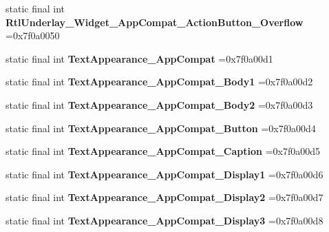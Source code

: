 \begin{DoxyCompactItemize}
static final int {\bfseries Rtl\+Underlay\+\_\+\+Widget\+\_\+\+App\+Compat\+\_\+\+Action\+Button\+\_\+\+Overflow} =0x7f0a0050
\item 
\mbox{\label{classproject4_1_1xaria_1_1R_1_1style_ad746fd97f7045ed3f1735d70d76e9b8c}} 
static final int {\bfseries Text\+Appearance\+\_\+\+App\+Compat} =0x7f0a00d1
\item 
\mbox{\label{classproject4_1_1xaria_1_1R_1_1style_af5e974f4d425de082885418842ece0b6}} 
static final int {\bfseries Text\+Appearance\+\_\+\+App\+Compat\+\_\+\+Body1} =0x7f0a00d2
\item 
\mbox{\label{classproject4_1_1xaria_1_1R_1_1style_af307531041d8a1179502a497781e851b}} 
static final int {\bfseries Text\+Appearance\+\_\+\+App\+Compat\+\_\+\+Body2} =0x7f0a00d3
\item 
\mbox{\label{classproject4_1_1xaria_1_1R_1_1style_a5e00b61bbb6da88ff24a04623fab1ce2}} 
static final int {\bfseries Text\+Appearance\+\_\+\+App\+Compat\+\_\+\+Button} =0x7f0a00d4
\item 
\mbox{\label{classproject4_1_1xaria_1_1R_1_1style_a8b34bb82b312c74e69f8eb02b7ac915a}} 
static final int {\bfseries Text\+Appearance\+\_\+\+App\+Compat\+\_\+\+Caption} =0x7f0a00d5
\item 
\mbox{\label{classproject4_1_1xaria_1_1R_1_1style_a851ed6e82ce55944280eeaa3a0200ccc}} 
static final int {\bfseries Text\+Appearance\+\_\+\+App\+Compat\+\_\+\+Display1} =0x7f0a00d6
\item 
\mbox{\label{classproject4_1_1xaria_1_1R_1_1style_a773614589dcceb57d00f247c7ff80e7e}} 
static final int {\bfseries Text\+Appearance\+\_\+\+App\+Compat\+\_\+\+Display2} =0x7f0a00d7
\item 
\mbox{\label{classproject4_1_1xaria_1_1R_1_1style_a0eec1becc4f34795f43240b0baf41f74}} 
static final int {\bfseries Text\+Appearance\+\_\+\+App\+Compat\+\_\+\+Display3} =0x7f0a00d8
\item 

\end{DoxyCompactItemize}
